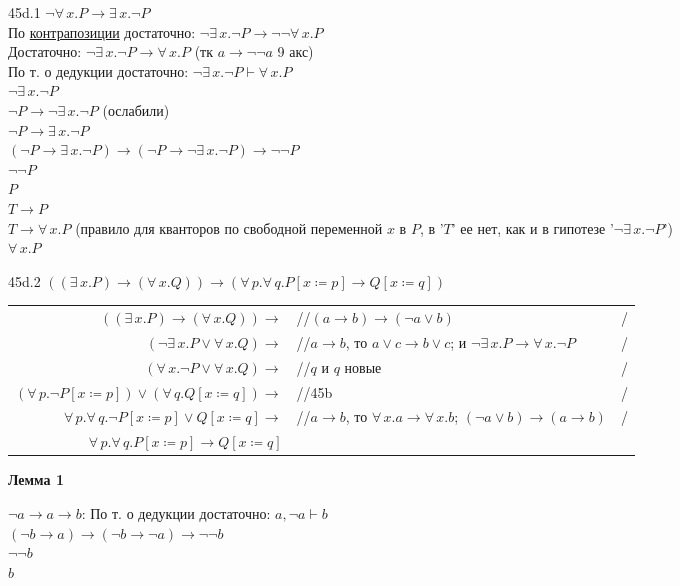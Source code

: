 \documentclass[12pt]{article}
\begin{document}


45d.1 $\neg \forall\,x.P\to\exists\,x.\neg P$\\
По \hyperlink{conter}{контрапозиции} достаточно: $\neg\exists\,x.\neg P\to\neg\neg\forall\,x.P$\\
Достаточно: $\neg\exists\,x.\neg P\to\forall\,x.P$ (тк $a\to\neg\neg a$ 9 акс)\\
По т. о дедукции достаточно: $\neg\exists\,x.\neg P\vdash\forall\,x.P$\\
$\neg\exists\,x.\neg P$\\
$\neg P\to\neg\exists\,x.\neg P$ (ослабили)\\
$\neg P\to\exists\,x.\neg P$\\
$(\neg P\to\exists\,x.\neg P)\to(\neg P\to\neg\exists\,x.\neg P)\to\neg\neg P$\\
$\neg\neg P$\\
$P$\\
$T\to P$\\
$T\to\forall\,x.P$ (правило для кванторов по свободной переменной $x$ в $P$, в '$T$' ее нет, как и в гипотезе '$\neg\exists\,x.\neg P$')\\
$\forall\,x.P$

\bigskip

45d.2 $((\exists\,x.P)\to(\forall\,x.Q))\to(\forall\,p.\forall\,q.P[x\coloneqq p]\to Q[x\coloneqq q])$\\

\begin{tabular*}{\textwidth}{r l l}
	$((\exists\,x.P)\to(\forall\,x.Q))\to$ &//$(a\to b)\to(\neg a\vee b)$ &/\\
	$(\neg\exists\,x.P\vee\forall\,x.Q)\to$ &//$a\to b$, то $a\vee c\to b\vee c$; и $\neg\exists\,x.P\to\forall\,x.\neg P$&/\\
	$(\forall\,x.\neg P\vee\forall\,x.Q)\to$ &//$q$ и $q$ новые&/\\
	$(\forall\,p.\neg P[x\coloneqq p])\vee(\forall\,q.Q[x\coloneqq q])\to$ &//45b&/\\
	$\forall\,p.\forall\,q.\neg P[x\coloneqq p]\vee Q[x\coloneqq q]\to$ &//$a\to b$, то $\forall\,x.a\to\forall\,x.b$; $(\neg a\vee b)\to(a\to b)$&/\\
	$\forall\,p.\forall\,q.P[x\coloneqq p]\to Q[x\coloneqq q]$ &&
\end{tabular*}

\bigskip

{\bf \hypertarget{lemma1}{Лемма 1}}

$\neg a\to a\to b$:
По т. о дедукции достаточно: $a,\neg a\vdash b$\\
$(\neg b\to a)\to(\neg b\to\neg a)\to\neg\neg b$\\
$\neg\neg b$\\
$b$
\end{document}
